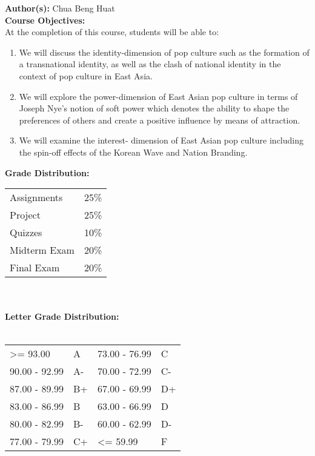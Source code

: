 \documentclass[11pt]{article}
\begin{document}
\textbf {Author(s):} Chua Beng Huat\\

\textbf {\large Course Objectives:} \\
At the completion of this course, students will be able to:
\begin{enumerate} \itemsep-0.4em
  \item We will discuss the identity-dimension of pop culture such as the formation of a transnational identity, as well as the clash of national identity in the context of pop culture in East Asia.
  \item We will explore the power-dimension of East Asian pop culture in terms of Joseph Nye’s notion of soft power which denotes the ability to shape the preferences of others and create a positive influence by means of attraction.
  \item We will examine the interest- dimension of East Asian pop culture including the spin-off effects of the Korean Wave and Nation Branding.

\end{enumerate}

\textbf {\large Grade Distribution:} \\
\hspace*{40mm}
\begin{tabular}{ l l }

Assignments & 25\% \\
Project & 25\% \\
Quizzes  & 10\% \\
Midterm Exam  & 20\% \\
Final Exam  & 20\%
\end{tabular} \\\\

\textbf {\large Letter Grade Distribution:} \\\\
\hspace*{40mm}
\begin{tabular}{ l l | l l }
\textgreater= 93.00 & A & 73.00 - 76.99 & C \\
90.00 - 92.99 & A-  & 70.00 - 72.99 & C- \\
87.00 - 89.99 & B+  & 67.00 - 69.99 & D+ \\
83.00 - 86.99 & B  & 63.00 - 66.99 & D \\
80.00 - 82.99 & B-  & 60.00 - 62.99 & D- \\
77.00 - 79.99 & C+  & \textless= 59.99 & F \\
\end{tabular} \\
\end{document}
